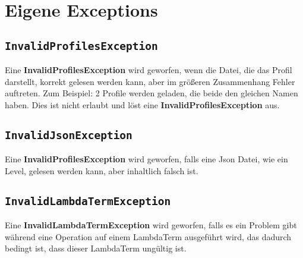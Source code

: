 \section{Eigene Exceptions}

\subsection{\texttt{InvalidProfilesException}}
Eine \textbf{InvalidProfilesException} wird geworfen, wenn die Datei, die das Profil darstellt, korrekt gelesen werden kann, aber im größeren Zusammenhang Fehler auftreten.
Zum Beispiel: 2 Profile werden geladen, die beide den gleichen Namen haben. Dies ist nicht erlaubt und löst eine \textbf{InvalidProfilesException} aus.

\subsection{\texttt{InvalidJsonException}}
Eine \textbf{InvalidProfilesException} wird geworfen, falls eine Json Datei, wie ein Level, gelesen werden kann, aber inhaltlich falsch ist.

\subsection{\texttt{InvalidLambdaTermException}}
Eine \textbf{InvalidLambdaTermException} wird geworfen, falls es ein Problem gibt während eine Operation auf einem LambdaTerm ausgeführt wird, das dadurch bedingt ist, dass dieser LambdaTerm ungültig ist.
